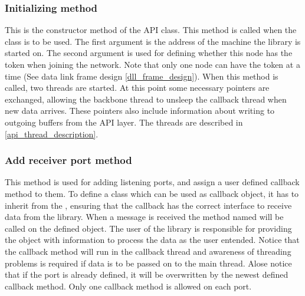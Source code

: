 \subsubsection{Initializing method}
This is the constructor method of the API class. This method is called when the class is to be used. The first argument is the address of the machine the library is started on. The second argument is used for defining whether this node has the token when joining the network. Note that only one node can have the token at a time (See data link frame design \ref{dll_frame_design}). When this method is called, two threads are started. At this point some necessary pointers are exchanged, allowing the backbone thread to unsleep the callback thread when new data arrives. These pointers also include information about writing to outgoing buffers from the API layer. The threads are described in \ref{api_thread_description}.

\subsubsection{Add receiver port method}
This method is used for adding listening ports, and assign a user defined callback method to them. To define a class which can be used as callback object, it has to inherit from the , ensuring that the callback has the correct interface to receive data from the library. When a message is received the method named  will be called on the defined object. The user of the library is responsible for providing the object with information to process the data as the user entended. Notice that the callback method will run in the callback thread and awareness of threading problems is required if data is to be passed on to the main thread. Alose notice that if the port is already defined, it will be overwritten by the newest defined callback method. Only one callback method is allowed on each port.


